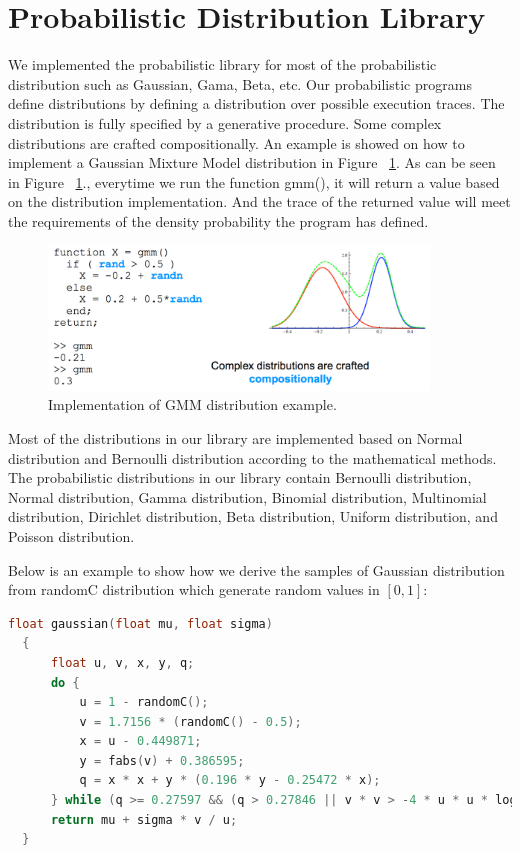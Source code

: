 \section{Probabilistic Distribution Library}
\label{sec:distr}
We implemented the probabilistic library for most of the probabilistic distribution such as Gaussian, Gama, Beta, etc. Our probabilistic programs define distributions by defining a distribution over possible execution traces. The distribution is fully specified by a generative procedure. Some complex distributions are crafted compositionally. An example is showed on how to implement a Gaussian Mixture Model distribution in Figure ~\ref{fig:gmm}. As can be seen in Figure ~\ref{fig:gmm}., everytime we run the function gmm(), it will return a value based on the distribution implementation. And the trace of the returned value will meet the requirements of the density probability the program has defined.

\begin{figure}
    \centering
    \includegraphics[width=0.9\textwidth]{figures/gmm.png}
    \caption{Implementation of GMM distribution example.}
    \label{fig:gmm}
\end{figure}


Most of the distributions in our library are implemented based on Normal distribution and Bernoulli distribution according to the mathematical methods. The probabilistic distributions in our library contain Bernoulli distribution, Normal distribution, Gamma distribution, Binomial distribution, Multinomial distribution, Dirichlet distribution, Beta distribution, Uniform distribution, and Poisson distribution.

Below is an example to show how we derive the samples of Gaussian distribution from randomC distribution which generate random values in $[0, 1]$:

\begin{lstlisting}[language=C]
  float gaussian(float mu, float sigma)
  {
      float u, v, x, y, q;
      do {
          u = 1 - randomC();
          v = 1.7156 * (randomC() - 0.5);
          x = u - 0.449871;
          y = fabs(v) + 0.386595;
          q = x * x + y * (0.196 * y - 0.25472 * x);
      } while (q >= 0.27597 && (q > 0.27846 || v * v > -4 * u * u * log(u)));
      return mu + sigma * v / u;
  }
\end{lstlisting}


